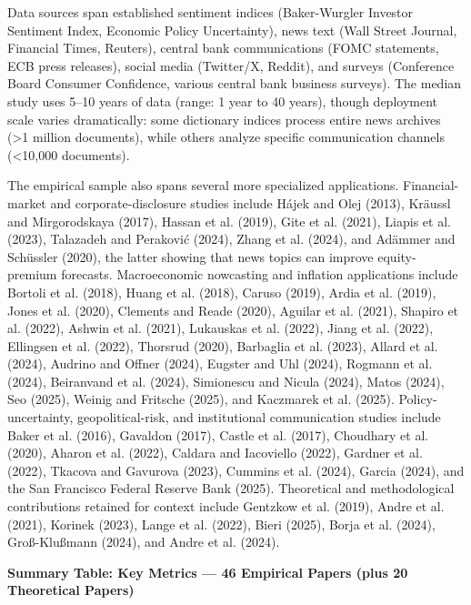 \documentclass[11pt,twocolumn]{article}
\begin{document}
Data sources span established sentiment indices (Baker-Wurgler Investor Sentiment Index, Economic Policy Uncertainty), news text (Wall Street Journal, Financial Times, Reuters), central bank communications (FOMC statements, ECB press releases), social media (Twitter/X, Reddit), and surveys (Conference Board Consumer Confidence, various central bank business surveys). The median study uses 5--10 years of data (range: 1 year to 40 years), though deployment scale varies dramatically: some dictionary indices process entire news archives (>1 million documents), while others analyze specific communication channels (<10,000 documents).

The empirical sample also spans several more specialized applications. Financial-market and corporate-disclosure studies include H\'ajek and Olej (2013), Kr\"aussl and Mirgorodskaya (2017), Hassan et al. (2019), Gite et al. (2021), Liapis et al. (2023), Talazadeh and Perakovi\'c (2024), Zhang et al. (2024), and Ad\"ammer and Sch\"ussler (2020), the latter showing that news topics can improve equity-premium forecasts. Macroeconomic nowcasting and inflation applications include Bortoli et al. (2018), Huang et al. (2018), Caruso (2019), Ardia et al. (2019), Jones et al. (2020), Clements and Reade (2020), Aguilar et al. (2021), Shapiro et al. (2022), Ashwin et al. (2021), Lukauskas et al. (2022), Jiang et al. (2022), Ellingsen et al. (2022), Thorsrud (2020), Barbaglia et al. (2023), Allard et al. (2024), Audrino and Offner (2024), Eugster and Uhl (2024), Rogmann et al. (2024), Beiranvand et al. (2024), Simionescu and Nicula (2024), Matos (2024), Seo (2025), Weinig and Fritsche (2025), and Kaczmarek et al. (2025). Policy-uncertainty, geopolitical-risk, and institutional communication studies include Baker et al. (2016), Gavaldon (2017), Castle et al. (2017), Choudhary et al. (2020), Aharon et al. (2022), Caldara and Iacoviello (2022), Gardner et al. (2022), Tkacova and Gavurova (2023), Cummins et al. (2024), Garcia (2024), and the San Francisco Federal Reserve Bank (2025). Theoretical and methodological contributions retained for context include Gentzkow et al. (2019), Andre et al. (2021), Korinek (2023), Lange et al. (2022), Bieri (2025), Borja et al. (2024), Gro{\ss}-Klu{\ss}mann (2024), and Andre et al. (2024).

\noindent\textbf{Summary Table: Key Metrics --- 46 Empirical Papers (plus 20 Theoretical Papers)}
\end{document}
